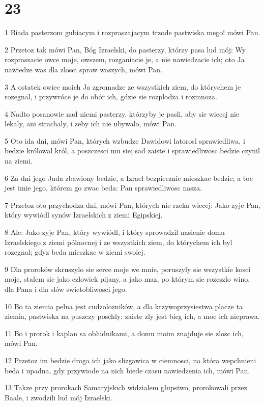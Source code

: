 \chapter{23}

\par 1 Biada pasterzom gubiacym i rozpraszajacym trzode pastwiska mego! mówi Pan.
\par 2 Przetoz tak mówi Pan, Bóg Izraelski, do pasterzy, którzy pasa lud mój: Wy rozpraszacie owce moje, owszem, rozganiacie je, a nie nawiedzacie ich; oto Ja nawiedze was dla zlosci spraw waszych, mówi Pan.
\par 3 A ostatek owiec moich Ja zgromadze ze wszystkich ziem, do którychem je rozegnal, i przywróce je do obór ich, gdzie sie rozplodza i rozmnoza.
\par 4 Nadto posanowie nad niemi pasterzy, którzyby je pasli, aby sie wiecej nie lekaly, ani strachaly, i zeby ich nie ubywalo, mówi Pan.
\par 5 Oto ida dni, mówi Pan, których wzbudze Dawidowi latorosl sprawiedliwa, i bedzie królowal król, a poszczesci mu sie; sad zaiste i sprawiedliwosc bedzie czynil na ziemi.
\par 6 Za dni jego Juda zbawiony bedzie, a Izrael bezpiecznie mieszkac bedzie; a toc jest imie jego, którem go zwac beda: Pan sprawiedliwosc nasza.
\par 7 Przetoz oto przychodza dni, mówi Pan, których nie rzeka wiecej: Jako zyje Pan, który wywiódl synów Izraelskich z ziemi Egipskiej.
\par 8 Ale: Jako zyje Pan, który wywiódl, i który sprowadzil nasienie domu Izraelskiego z ziemi pólnocnej i ze wszystkich ziem, do którychem ich byl rozegnal; gdyz beda mieszkac w ziemi swoiej.
\par 9 Dla proroków skruszylo sie serce moje we mnie, poruszyly sie wszystkie kosci moje, stalem sie jako czlowiek pijany, a jako maz, po którym sie rozeszlo wino, dla Pana i dla slów swietobliwosci jego.
\par 10 Bo ta ziemia pelna jest cudzolozników, a dla krzywoprzysiestwa placze ta ziemia, pastwiska na puszczy poschly; zaiste zly jest bieg ich, a moc ich nieprawa.
\par 11 Bo i prorok i kaplan sa obludnikami, a domu moim znajduje sie zlosc ich, mówi Pan.
\par 12 Przetoz im bedzie droga ich jako slizgawica w ciemnosci, na która wepchnieni beda i upadna, gdy przywiode na nich biede czasu nawiedzenia ich, mówi Pan.
\par 13 Takze przy prorokach Samaryjskich widzialem glupstwo, prorokowali przez Baale, i zwodzili lud mój Izraelski.
